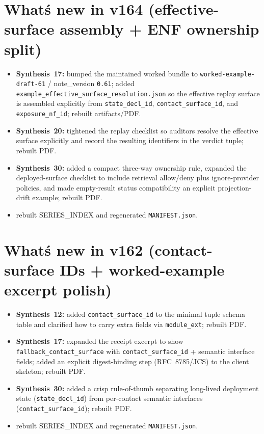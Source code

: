 \documentclass[11pt]{article}
\begin{document}
\section{What\'s new in v164 (effective-surface assembly + ENF ownership split)}
\begin{itemize}[leftmargin=*]
\item \textbf{Synthesis~17:} bumped the maintained worked bundle to \texttt{worked-example-draft-61} / note\_version \texttt{0.61}; added \texttt{example\_effective\_surface\_resolution.json} so the effective replay surface is assembled explicitly from \texttt{state\_decl\_id}, \texttt{contact\_surface\_id}, and \texttt{exposure\_nf\_id}; rebuilt artifacts/PDF.
\item \textbf{Synthesis~20:} tightened the replay checklist so auditors resolve the effective surface explicitly and record the resulting identifiers in the verdict tuple; rebuilt PDF.
\item \textbf{Synthesis~30:} added a compact three-way ownership rule, expanded the deployed-surface checklist to include retrieval allow/deny plus ignore-provider policies, and made empty-result status compatibility an explicit projection-drift example; rebuilt PDF.
\item rebuilt SERIES\_INDEX and regenerated \texttt{MANIFEST.json}.
\end{itemize}

\section{What\'s new in v162 (contact-surface IDs + worked-example excerpt polish)}
\begin{itemize}[leftmargin=*]
\item \textbf{Synthesis~12:} added \texttt{contact\_surface\_id} to the minimal tuple schema table and clarified how to carry extra fields via \texttt{module\_ext}; rebuilt PDF.
\item \textbf{Synthesis~17:} expanded the receipt excerpt to show \texttt{fallback\_contact\_surface} with \texttt{contact\_surface\_id} + semantic interface fields; added an explicit digest-binding step (RFC~8785/JCS) to the client skeleton; rebuilt PDF.
\item \textbf{Synthesis~30:} added a crisp rule-of-thumb separating long-lived deployment state (\texttt{state\_decl\_id}) from per-contact semantic interfaces (\texttt{contact\_surface\_id}); rebuilt PDF.
\item rebuilt SERIES\_INDEX and regenerated \texttt{MANIFEST.json}.
\end{itemize}
\end{document}
